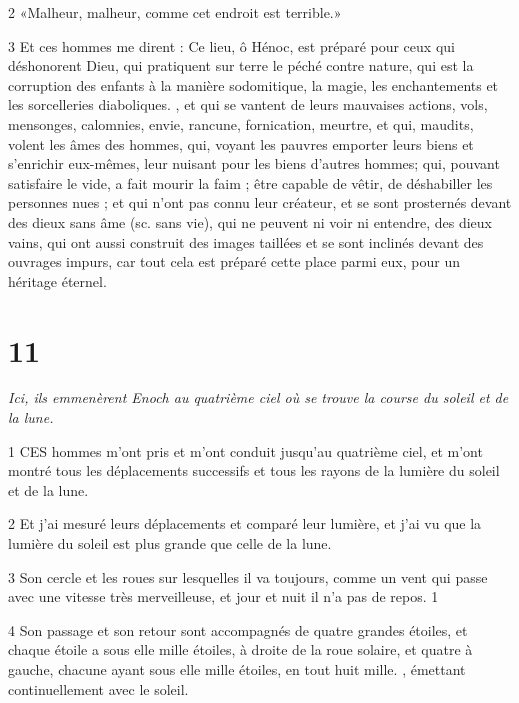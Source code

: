 \par 2 «Malheur, malheur, comme cet endroit est terrible.»

\par 3 Et ces hommes me dirent : Ce lieu, ô Hénoc, est préparé pour ceux qui déshonorent Dieu, qui pratiquent sur terre le péché contre nature, qui est la corruption des enfants à la manière sodomitique, la magie, les enchantements et les sorcelleries diaboliques. , et qui se vantent de leurs mauvaises actions, vols, mensonges, calomnies, envie, rancune, fornication, meurtre, et qui, maudits, volent les âmes des hommes, qui, voyant les pauvres emporter leurs biens et s'enrichir eux-mêmes, leur nuisant pour les biens d'autres hommes; qui, pouvant satisfaire le vide, a fait mourir la faim ; être capable de vêtir, de déshabiller les personnes nues ; et qui n'ont pas connu leur créateur, et se sont prosternés devant des dieux sans âme (sc. sans vie), qui ne peuvent ni voir ni entendre, des dieux vains, qui ont aussi construit des images taillées et se sont inclinés devant des ouvrages impurs, car tout cela est préparé cette place parmi eux, pour un héritage éternel.

\chapter{11}

\par \textit{Ici, ils emmenèrent Enoch au quatrième ciel où se trouve la course du soleil et de la lune.}

\par 1 CES hommes m'ont pris et m'ont conduit jusqu'au quatrième ciel, et m'ont montré tous les déplacements successifs et tous les rayons de la lumière du soleil et de la lune.

\par 2 Et j'ai mesuré leurs déplacements et comparé leur lumière, et j'ai vu que la lumière du soleil est plus grande que celle de la lune.

\par 3 Son cercle et les roues sur lesquelles il va toujours, comme un vent qui passe avec une vitesse très merveilleuse, et jour et nuit il n'a pas de repos. 1

\par 4 Son passage et son retour sont accompagnés de quatre grandes étoiles, et chaque étoile a sous elle mille étoiles, à droite de la roue solaire, et quatre à gauche, chacune ayant sous elle mille étoiles, en tout huit mille. , émettant continuellement avec le soleil.

